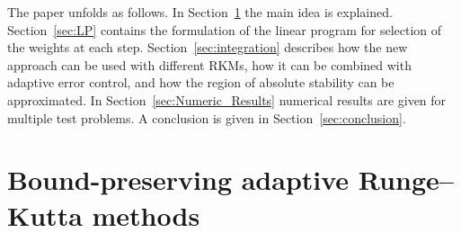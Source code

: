 \documentclass[a4paper]{article}
\numberwithin{equation}{section}
\theoremstyle{plain}
\theoremstyle{definition}
\numberwithin{theorem}{section}
\newcommand{\1}{\mathbbm{1}}
\begin{document}
The paper unfolds as follows. In Section~\ref{sec:main_idea} the main idea is
explained. Section~\ref{sec:LP} contains the formulation of the linear program
for selection of the weights at each step.
Section~\ref{sec:integration} describes how the new approach can be used with
different RKMs, how it can be combined with adaptive error control, and how the
region of absolute stability can be approximated.
In Section~\ref{sec:Numeric_Results} numerical results are given for multiple test problems.
A conclusion is given in Section~\ref{sec:conclusion}.



\section{Bound-preserving adaptive Runge--Kutta methods}\label{sec:main_idea}
\end{document}
